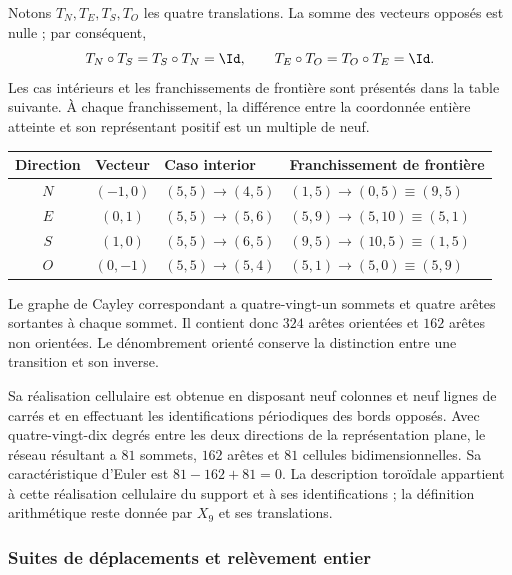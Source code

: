 Notons $T_N,T_E,T_S,T_O$ les quatre translations. La somme des vecteurs opposés est nulle ; par conséquent,
\[
 T_N\circ T_S=T_S\circ T_N=\Id,
 \qquad T_E\circ T_O=T_O\circ T_E=\Id.
\]
Les cas intérieurs et les franchissements de frontière sont présentés dans la table suivante. À chaque franchissement, la différence entre la coordonnée entière atteinte et son représentant positif est un multiple de neuf.

\begin{tablacompleta}[htbp]
\caption{Transitions intérieures et franchissements de frontière dans la représentation matricielle d'APP.}
\label{tab:app-frontera}
\begin{tabular}{ccll}
\toprule
Direction & Vecteur & Caso interior & Franchissement de frontière\\
\midrule
$N$ &$(-1,0)$&$(5,5)\to(4,5)$&$(1,5)\to(0,5)\equiv(9,5)$\\
$E$ &$(0,1)$&$(5,5)\to(5,6)$&$(5,9)\to(5,10)\equiv(5,1)$\\
$S$ &$(1,0)$&$(5,5)\to(6,5)$&$(9,5)\to(10,5)\equiv(1,5)$\\
$O$ &$(0,-1)$&$(5,5)\to(5,4)$&$(5,1)\to(5,0)\equiv(5,9)$\\
\bottomrule
\end{tabular}
\end{tablacompleta}

Le graphe de Cayley correspondant a quatre-vingt-un sommets et quatre arêtes sortantes à chaque sommet. Il contient donc $324$ arêtes orientées et $162$ arêtes non orientées. Le dénombrement orienté conserve la distinction entre une transition et son inverse.

Sa réalisation cellulaire est obtenue en disposant neuf colonnes et neuf lignes de carrés et en effectuant les identifications périodiques des bords opposés. Avec quatre-vingt-dix degrés entre les deux directions de la représentation plane, le réseau résultant a $81$ sommets, $162$ arêtes et $81$ cellules bidimensionnelles. Sa caractéristique d'Euler est $81-162+81=0$. La description toroïdale appartient à cette réalisation cellulaire du support et à ses identifications ; la définition arithmétique reste donnée par $X_9$ et ses translations.

\subsubsection{Suites de déplacements et relèvement entier}

